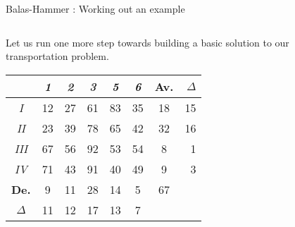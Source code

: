 \documentclass[32pt,aspectratio=169]{beamer}
\begin{document}
\begin{frame}{Balas-Hammer : Working out an example}
  \begin{columns}
    \begin{column}{.6\textwidth}
      \vfill
      
      Let us run one more step towards building a basic solution to
      our transportation problem.
      \vspace{1.3\baselineskip}

      \begin{overlayarea}{\textwidth}{.5\textheight}      
        \vspace{.22cm}
        \small{
          \begin{tabular}{c|c|c|c|c|c|c|r}
            & \textit{1} & \textit{2} & \textit{3} & \textit{5} & \textit{6} & \cellcolor{blue!50}\textbf{Av.} & \color{blue}$\Delta$ \\
            \hline
            \textit{I} & \cellcolor{blue!25}12 & \cellcolor{blue!25}27 & \cellcolor{blue!25}61 & \cellcolor{blue!25}83 & \cellcolor{blue!25}35 & \cellcolor{blue!50}18 & \color{blue}15 \\
            \hline 
            \textit{II} & \cellcolor{blue!25}23 & \cellcolor{blue!25}39 & \cellcolor{blue!25}78 &  \cellcolor{blue!25}65 & \cellcolor{blue!25}42 & \cellcolor{blue!50}32 & \color{blue}16\\
            \hline
            \textit{III} & \cellcolor{blue!25}67 & \cellcolor{blue!25}56 & \cellcolor{blue!25}92 & \cellcolor{blue!25}53 & \cellcolor{blue!25}54 & \cellcolor{blue!50}8 & \color{blue}1\\
            \hline
            \textit{IV} & \cellcolor{blue!25}71 & \cellcolor{blue!25}43 & \cellcolor{blue!25}91 & \cellcolor{blue!25}40 & \cellcolor{blue!25}49 & \cellcolor{blue!50}9 & \color{blue}3\\
            \hline 
            \cellcolor{blue!50}\textbf{De.} & \cellcolor{blue!50}9 & \cellcolor{blue!50}11 & \cellcolor{blue!50}28 & \cellcolor{blue!50}14 & \cellcolor{blue!50}5 & \cellcolor{blue!60}67  \\
            \cline{1-7}
            \color{blue}$\Delta$ & \color{blue}11 & \color{blue}12 & \color{blue}17 & \color{blue}13 & \color{blue}7
          \end{tabular}
        }
      \end{overlayarea}
    \end{column}
    \begin{column}{.4\textwidth}
        \begin{tikzpicture}

\end{tikzpicture}
\end{column}
\end{columns}
\end{frame}
\end{document}
